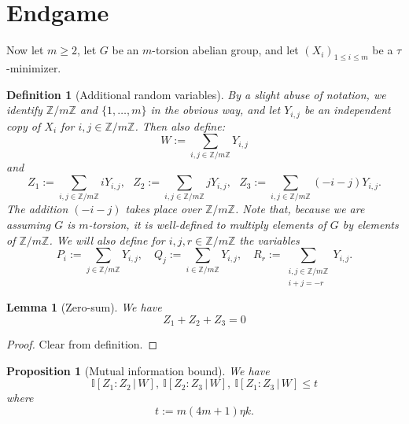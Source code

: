 \documentclass[10pt,a4paper]{article}
\newtheorem{lemma}[theorem]{Lemma}
\newtheorem{proposition}[theorem]{Proposition}
\newtheorem{definition}[theorem]{Definition}
\newcommand{\lean}[1]{}
\newcommand{\uses}[1]{}
\newcommand{\leanok}{}
\newcommand{\Z}{\mathbb{Z}}
\newcommand{\bbI}{\mathbb{I}}
\begin{document}
\section{Endgame}

Now let $m \geq 2$, let $G$ be an $m$-torsion abelian group, and let $(X_i)_{1 \leq i \leq m}$ be a $\tau$-minimizer.

\begin{definition}[Additional random variables]\label{more-random}\leanok  By a slight abuse of notation, we identify $\Z/m\Z$ and $\{1,\dots,m\}$ in the obvious way, and let $Y_{i,j}$ be an independent copy of $X_i$ for $i,j \in \Z/m\Z$.  Then also define:
  \[
    W := \sum_{i,j \in \Z/m\Z} Y_{i,j}
  \]
  and
  \[
    Z_1 := \sum_{i,j \in \Z/m\Z} i Y_{i,j},\ \ \
    Z_2 := \sum_{i,j \in \Z/m\Z} j Y_{i,j},\ \ \
    Z_3 := \sum_{i,j \in \Z/m\Z} (-i-j) Y_{i,j}.
  \]
  The addition $(-i-j)$ takes place over $\Z/m\Z$.
  Note that, because we are assuming $G$ is $m$-torsion, it is well-defined to multiply elements of $G$ by elements of $\Z/m\Z$.
  We will also define for $i,j,r \in \Z/m\Z$ the variables
  \begin{equation}\label{pqr-defs}
    P_i := \sum_{j \in \Z/m\Z} Y_{i,j} , \quad
    Q_j := \sum_{i \in \Z/m\Z} Y_{i,j} , \quad
    R_r := \sum_{\substack{i,j \in \Z/m\Z \\ i+j=-r}} Y_{i,j} .\end{equation}
\end{definition}

\begin{lemma}[Zero-sum]\label{Zero-sum}\lean{sum_of_z_eq_zero}\leanok We have
  \begin{equation}%
    \label{eq:sum-zero}
    Z_1+Z_2+Z_3= 0
  \end{equation}
\end{lemma}

\begin{proof}\uses{more-random}\leanok  Clear from definition.
\end{proof}

\begin{proposition}[Mutual information bound]\label{prop:52}\lean{mutual_information_le_t_12, mutual_information_le_t_13, mutual_information_le_t_23}\uses{more-random}\leanok
  We have
  \[
    \bbI[Z_1 : Z_2\, |\, W],\
    \bbI[Z_2 : Z_3\, |\, W],\
    \bbI[Z_1 : Z_3\, |\, W] \leq t
  \]
  where
  \begin{equation}\label{t-def}
    t :=  m(4m+1) \eta k.
  \end{equation}
\end{proposition}
\end{document}
